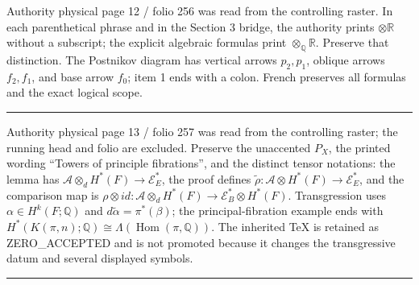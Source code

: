 \documentclass[
  english,
  a3paper,
  a3paper]{extarticle}
\begin{document}
\fontsize{11}{14}\selectfont

Authority physical page 12 / folio 256 was read from the controlling
raster. In each parenthetical phrase and in the Section 3 bridge, the
authority prints \(\otimes\mathbb R\) without a subscript; the explicit
algebraic formulas print \(\otimes_{\mathbb Q}\mathbb R\). Preserve that
distinction. The Postnikov diagram has vertical arrows \(p_2,p_1\),
oblique arrows \(f_2,f_1\), and base arrow \(f_0\); item 1 ends with a
colon. French preserves all formulas and the exact logical scope.

\clearpage



\par

\vspace{0.7mm}\hrule\vspace{1.6mm}

\fontsize{11}{14}\selectfont

Authority physical page 13 / folio 257 was read from the controlling
raster; the running head and folio are excluded. Preserve the unaccented
\(P_X\), the printed wording ``Towers of principle fibrations'', and the
distinct tensor notations: the lemma has
\(\mathcal A\otimes_d H^*(F)\to\mathcal E_E^*\), the proof defines
\(\widetilde\rho:\mathcal A\otimes H^*(F)\to\mathcal E_E^*\), and the
comparison map is
\(\rho\otimes id:\mathcal A\otimes_d H^*(F)\to\mathcal E_B^*\otimes H^*(F)\).
Transgression uses \(\alpha\in H^k(F;\mathbb Q)\) and
\(d\widetilde\alpha=\pi^*(\beta)\); the principal-fibration example ends
with
\(H^*(K(\pi,n);\mathbb Q)\cong\Lambda(\operatorname{Hom}(\pi,\mathbb Q))\).
The inherited TeX is retained as ZERO\_ACCEPTED and is not promoted
because it changes the transgressive datum and several displayed
symbols.

\clearpage



\par

\vspace{0.7mm}\hrule\vspace{1.6mm}

\fontsize{11}{14}\selectfont
\end{document}
